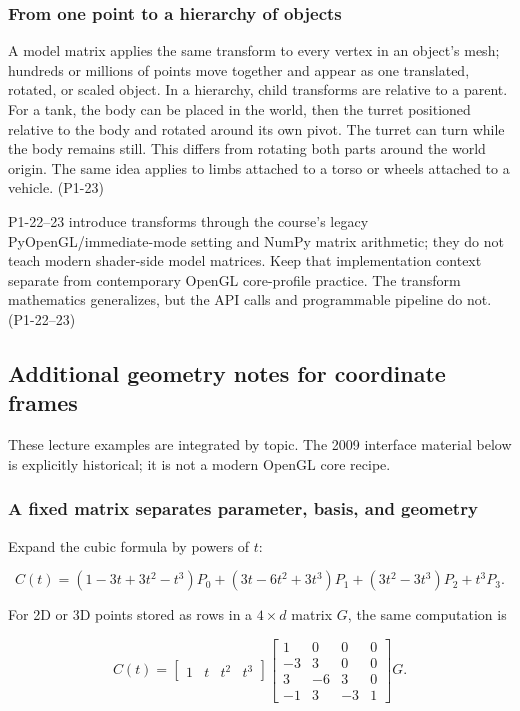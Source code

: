 \subsubsection{From one point to a hierarchy of objects}\label{03-visual-computing-i-ch001-from-one-point-to-a-hierarchy-of-objects}

A model matrix applies the same transform to every vertex in an object's mesh; hundreds or millions of points move together and appear as one translated, rotated, or scaled object. In a hierarchy, child transforms are relative to a parent. For a tank, the body can be placed in the world, then the turret positioned relative to the body and rotated around its own pivot. The turret can turn while the body remains still. This differs from rotating both parts around the world origin. The same idea applies to limbs attached to a torso or wheels attached to a vehicle. (P1-23)

P1-22--23 introduce transforms through the course's legacy PyOpenGL/immediate-mode setting and NumPy matrix arithmetic; they do not teach modern shader-side model matrices. Keep that implementation context separate from contemporary OpenGL core-profile practice. The transform mathematics generalizes, but the API calls and programmable pipeline do not. (P1-22--23)

\subsection{Additional geometry notes for coordinate frames}\label{03-visual-computing-i-ch001-additional-geometry-notes-for-coordinate-frames}

These lecture examples are integrated by topic. The 2009 interface material below is explicitly historical; it is not a modern OpenGL core recipe.

\subsubsection{A fixed matrix separates parameter, basis, and geometry}\label{03-visual-computing-i-ch001-a-fixed-matrix-separates-parameter-basis-and-geometry}

Expand the cubic formula by powers of \(t\):

\[
C(t)=(1-3t+3t^2-t^3)P_0+(3t-6t^2+3t^3)P_1+(3t^2-3t^3)P_2+t^3P_3.
\]

For 2D or 3D points stored as rows in a \(4\times d\) matrix \(G\), the same computation is

\[
C(t)=\begin{bmatrix}1&t&t^2&t^3\end{bmatrix}
\begin{bmatrix}1&0&0&0\\-3&3&0&0\\3&-6&3&0\\-1&3&-3&1\end{bmatrix}G.
\]

